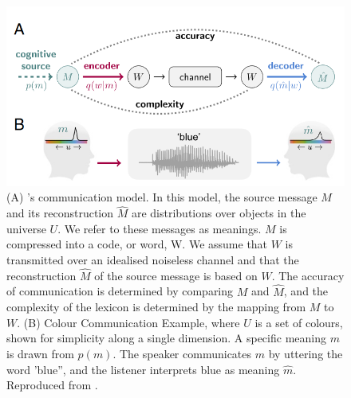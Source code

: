 \begin{figure}[hbt!]
 \centering
 \includegraphics[width=1\textwidth]{image/lit/datacompress1.PNG}
 \caption[(A) Shannon's communication model. In this model, the source
 message $M$ and its reconstruction $\hat{M}$ are distributions over objects
 in the universe $U$. We refer to these messages as meanings. $M$ is compressed
 into a code, or word, W. We assume that $W$ is transmitted over an
 idealised noiseless channel and that the reconstruction $\hat{M}$
 of the source message is based on $W$.
 The accuracy of communication is determined by comparing $M$ and $\hat{M}$,
 and the complexity of the lexicon is determined by the mapping from $M$ to
 $W$. (B) Colour Communication Example, where $U$ is a set of colours, shown
 for simplicity along a single dimension. A specific meaning $m$ is drawn from
 $p(m)$. The speaker communicates $m$ by uttering the word “blue”, and the
 listener interprets blue as meaning $\hat{m}$] {(A)
 's communication model. In this model, the
 source message $M$ and its reconstruction $\hat{M}$ are distributions over
 objects in the universe $U$. We refer to these messages as meanings. $M$ is
 compressed into a code, or word, W. We assume that $W$ is transmitted over an
 idealised noiseless channel and that the reconstruction $\hat{M}$ of the
 source message is based on $W$. The accuracy of communication is determined by
 comparing $M$ and $\hat{M}$, and the complexity of the lexicon is determined
 by the mapping from $M$ to $W$. (B) Colour Communication Example, where $U$
 is a set of colours, shown for simplicity along a single dimension. A specific
 meaning $m$ is drawn from $p(m)$. The speaker communicates $m$ by uttering the
 word 'blue”, and the listener interprets blue as meaning $\hat{m}$.
 Reproduced from .}
 \label{fig:datacompression1}
\end{figure}

